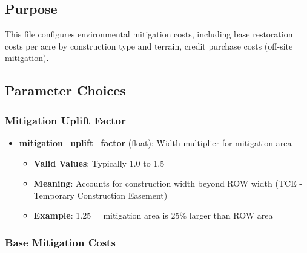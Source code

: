 \documentclass[ctcc_full_documentation.tex]{subfiles}
\begin{document}
\subsection{Purpose}

This file configures environmental mitigation costs, including base restoration costs per acre by construction type and terrain, credit purchase costs (off-site mitigation).

\subsection{Parameter Choices}

\subsubsection{Mitigation Uplift Factor}

\begin{itemize}
    \item \textbf{mitigation\_uplift\_factor} (float): Width multiplier for mitigation area
    \begin{itemize}
        \item \textbf{Valid Values}: Typically 1.0 to 1.5
        \item \textbf{Meaning}: Accounts for construction width beyond ROW width (TCE - Temporary Construction Easement)
        \item \textbf{Example}: 1.25 = mitigation area is 25\% larger than ROW area
    \end{itemize}
\end{itemize}

\subsubsection{Base Mitigation Costs}
\end{document}
